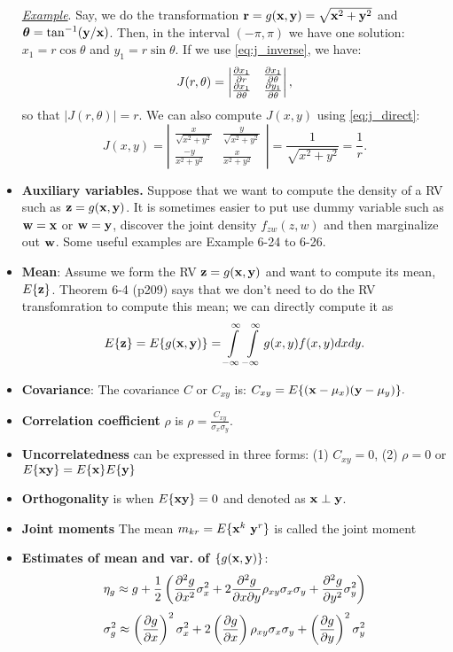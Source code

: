 \documentclass[a4paper, oneside]{book}
\begin{document}
\begin{itemize}
\underline{\textit{Example}}. Say, we do the transformation $\mathbf r = g(\mathbf{x,y}) = \sqrt{\mathbf x^2+\mathbf y^2}$ and $\boldsymbol \theta = \tan^{-1}(\mathbf{y/x})$. Then, in the interval $(-\pi,\pi)$ we have one solution: $x_1 = r\cos \theta$ and $y_1 = r \sin \theta$. If we use \eqref{eq:j_inverse}, we have: %
$$J(r,\theta) = \left| \begin{matrix} \frac{\partial x_1}{\partial r} & \frac{\partial x_1}{\partial \theta} \\ 
\frac{\partial x_1}{\partial \theta} & \frac{\partial y_1}{\partial \theta} \end{matrix}\right|,$$
%
so that $|J(r,\theta)| = r$. We can also compute $J(x,y)$ using \eqref{eq:j_direct}: %
$$J(x,y) = \left| \begin{matrix}
\frac{x}{\sqrt{x^2+y^2}} & \frac{y}{\sqrt{x^2+y^2}} \\
\frac{-y}{x^2+y^2} & \frac{x}{x^2+y^2}
\end{matrix} \right| = \frac{1}{\sqrt{x^2+y^2}} = \frac{1}{r}.$$ 
%
\item \textbf{Auxiliary variables.}  Suppose that we want to compute the density of a RV such as $\mathbf z = g(\mathbf{x,y})$. It is sometimes easier to put use dummy variable such as $\mathbf{w=x}$ or $\mathbf{w=y}$, discover the joint density $f_{zw}(z,w)$ and then marginalize out $\mathbf w$. Some useful examples are Example 6-24 to 6-26.

\item \textbf{Mean}: Assume we form the RV $\mathbf z = g(\mathbf{x,y})$ and want to compute its mean, $E\{\mathbf z\}$. Theorem 6-4 (p209) says that we don't need to do the RV transfomration to compute this mean; we can directly compute it as $$E\{\mathbf z\} = E\{g(\mathbf{x,y})\} = \int\limits_{-\infty}^{\infty}\int\limits_{-\infty}^{\infty} g(x,y) f(x,y) dx dy.$$
\item \textbf{Covariance}: The covariance $C$ or $C_{xy}$ is: $C_{xy} = E\{(\mathbf x - \mu_x)(\mathbf y - \mu_y)\}.$
\item \textbf{Correlation coefficient} $\rho$ is $\rho = \frac{C_{xy}}{\sigma_x \sigma_y}$.
\item \textbf{Uncorrelatedness} can be expressed in three forms: (1) $C_{xy} = 0$, (2) $\rho = 0$ or $E\{\mathbf{xy}\} = E\{\mathbf x\}E\{\mathbf y\}$
\item \textbf{Orthogonality}  is  when $E\{\mathbf{xy}\} = 0$ and denoted as $\mathbf x \perp \mathbf y$. \item \textbf{Joint moments} The mean $m_{kr} = E\{\mathbf x^k\ \mathbf y^r\}$ is called the joint moment
\item \textbf{Estimates of mean and var. of $\{g(\mathbf{x,y})\}$}: $$\eta_g \approx g + \frac{1}{2}\left( \frac{\partial^2 g}{\partial x^2}\sigma_x^2 + 2 \frac{\partial^2g}{\partial x \partial y}\rho_{xy} \sigma_x  \sigma_y + \frac{\partial^2 g}{\partial y^2} \sigma_y^2  \right)$$
$$\sigma_g^2 \approx \left( \frac{\partial g}{\partial x} \right)^2 \sigma_x^2  + 2\left( \frac{\partial g}{\partial x} \right) \rho_{xy}\sigma_x \sigma_y  + \left( \frac{\partial g}{\partial y} \right)^2\sigma_y^2 $$
\end{itemize}
\end{document}
